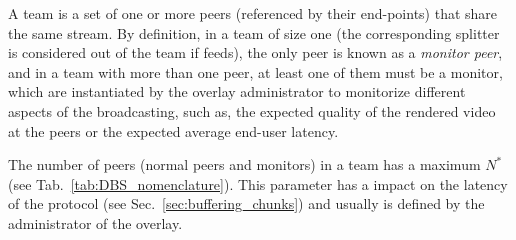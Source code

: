 

\label{sec:team_def}

A team is a set of one or more peers (referenced by their end-points)
that share the same stream. By definition, in a team of size one (the
corresponding splitter is considered out of the team if feeds), the
only peer is known as a \emph{monitor peer}, and in a team with more
than one peer, at least one of them must be a monitor, which
are instantiated by the overlay administrator to monitorize different
aspects of the broadcasting, such as, the expected quality of the
rendered video at the peers or the expected average end-user latency.

The number of peers (normal peers and monitors) in a team has a
maximum $N^*$ (see Tab.~\ref{tab:DBS_nomenclature}). This parameter
has a impact on the latency of the protocol (see
Sec.~\ref{sec:buffering_chunks}) and usually is defined by the
administrator of the overlay.

